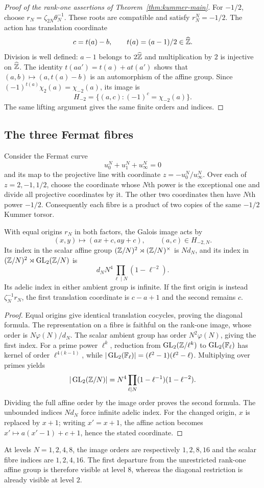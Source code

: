 \begin{proof}[Proof of the rank-one assertions of Theorem~\ref{thm:kummer-main}]
For $-1/2$, choose $r_N=\zeta_{2N}\theta_N^{-1}$.
These roots are compatible and satisfy $r_N^N=-1/2$.
The action has translation coordinate
\[
 c=t(a)-b,\qquad t(a)=(a-1)/2\in\widehat{\mathbb Z}.
\]
Division is well defined: $a-1$ belongs to $2\widehat{\mathbb Z}$ and
multiplication by $2$ is injective on $\widehat{\mathbb Z}$.
The identity $t(aa')=t(a)+at(a')$ shows that
$(a,b)\mapsto(a,t(a)-b)$ is an automorphism of the affine group.
Since $(-1)^{t(a)}\chi_2(a)=\chi_{-2}(a)$, its image is
\[
 H_{-2}=\{(a,c):(-1)^c=\chi_{-2}(a)\}.
\]
The same lifting argument gives the same finite orders and indices.
\end{proof}

\subsection{The three Fermat fibres}
Consider the Fermat curve
\[
 u_0^N+u_1^N+u_\infty^N=0
\]
and its map to the projective line with coordinate
$z=-u_0^N/u_\infty^N$. Over each of $z=2,-1,1/2$, choose the
coordinate whose $N$th power is the exceptional one and divide
all projective coordinates by it. The other two coordinates then
have $N$th power $-1/2$. Consequently each fibre is a product of
two copies of the same $-1/2$ Kummer torsor.

\begin{proposition}\label{prop:fermat-fibre}
With equal origins $r_N$ in both factors, the Galois image acts by
\[
 (x,y)\longmapsto(ax+c,ay+c),\qquad (a,c)\in H_{-2,N}.
\]
Its index in the scalar affine group
$(\mathbb Z/N)^2\rtimes(\mathbb Z/N)^\times$ is $Nd_N$, and its index in
$(\mathbb Z/N)^2\rtimes\operatorname{GL}_2(\mathbb Z/N)$ is
\[
 d_N N^4\prod_{\ell\mid N}(1-\ell^{-2}).
\]
Its adelic index in either ambient group is infinite. If the first
origin is instead $\zeta_N^{-1}r_N$, the first translation coordinate
is $c-a+1$ and the second remains $c$.
\end{proposition}
\begin{proof}
Equal origins give identical translation cocycles, proving the
diagonal formula. The representation on a fibre is faithful on
the rank-one image, whose order is $N\varphi(N)/d_N$.
The scalar ambient group has order $N^2\varphi(N)$, giving the
first index. For a prime power $\ell^k$, reduction from
$\operatorname{GL}_2(\mathbb Z/\ell^k)$ to
$\operatorname{GL}_2(\mathbb F_\ell)$ has kernel of order
$\ell^{4(k-1)}$, while
$|\operatorname{GL}_2(\mathbb F_\ell)|=(\ell^2-1)(\ell^2-\ell)$.
Multiplying over primes yields
\[
 |\operatorname{GL}_2(\mathbb Z/N)|
 =N^4\prod_{\ell\mid N}(1-\ell^{-1})(1-\ell^{-2}).
\]
Dividing the full affine order by the image order proves the second
formula. The unbounded indices $Nd_N$ force infinite adelic index.
For the changed origin, $x$ is replaced by $x+1$; writing $x'=x+1$, the
affine action becomes $x'\mapsto a(x'-1)+c+1$, hence the
stated coordinate.
\end{proof}
At levels $N=1,2,4,8$, the image orders are respectively $1,2,8,16$
and the scalar fibre indices are $1,2,4,16$. The first departure from
the unrestricted rank-one affine group is therefore visible at level
$8$, whereas the diagonal restriction is already visible at level $2$.

